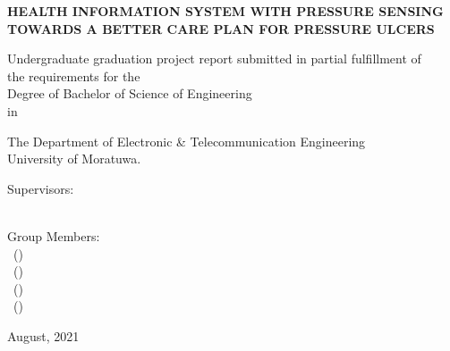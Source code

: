 \begin{titlepage}
  \vspace{1 in}
  \begin{center}
    \large{
    \MakeUppercase{\textbf{Health Information System with Pressure Sensing towards A Better Care Plan for Pressure Ulcers}}}\\
    \vspace{1.5 in}
    
    \normalsize
    Undergraduate graduation project report submitted in partial fulfillment of \\
    the requirements for the
\\
    Degree of Bachelor of Science of Engineering \\                                          
    in
\\
    
    \vspace{5mm}
    
    The Department of Electronic \& Telecommunication Engineering
 \\
    University of Moratuwa.
\\
    
    \vspace{50mm}
    
    \begin{flushleft}
    \begin{multicols}{2}
    	Supervisors: \\
    	\supervisorA \\
    	\vfill\null
    	\columnbreak
    	
    	Group Members: \\
    	\memberA \ (\indexA) \\
    	\memberB \ (\indexB) \\
    	\memberC \ (\indexC) \\
    	\memberD \ (\indexD) \\
    	

    \end{multicols}
    \end{flushleft}
    
    
    \vspace{40mm}
    August, 2021\\

  \end{center}
\end{titlepage}

